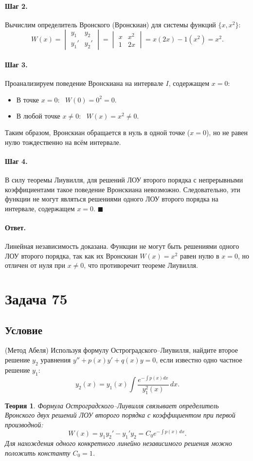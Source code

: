 \documentclass[12pt,a4paper]{article}
\theoremstyle{solution}
\newtheorem*{theory}{Теория}
\newcommand{\task}[1]{\newpage\section*{Задача #1}}
\newcommand{\answer}{\paragraph{Ответ.}}
\newcommand{\step}[1]{\paragraph{Шаг #1.}}
\begin{document}
\step{2} Вычислим определитель Вронского (Вронскиан) для системы функций $\{x, x^2\}$:
\[
W(x) = \begin{vmatrix} y_1 & y_2 \\ y_1' & y_2' \end{vmatrix} = \begin{vmatrix} x & x^2 \\ 1 & 2x \end{vmatrix} = x(2x) - 1(x^2) = x^2.
\]

\step{3} Проанализируем поведение Вронскиана на интервале $I$, содержащем $x = 0$:
\begin{itemize}
    \item В точке $x = 0$: \ $W(0) = 0^2 = 0$.
    \item В любой точке $x \neq 0$: \ $W(x) = x^2 \neq 0$.
\end{itemize}
Таким образом, Вронскиан обращается в нуль в одной точке ($x=0$), но не равен нулю тождественно на всём интервале.

\step{4} В силу теоремы Лиувилля, для решений ЛОУ второго порядка с непрерывными коэффициентами такое поведение Вронскиана невозможно. Следовательно, эти функции не могут являться решениями одного ЛОУ второго порядка на интервале, содержащем $x = 0$. \quad$\blacksquare$

\answer
Линейная независимость доказана. Функции не могут быть решениями одного ЛОУ второго порядка, так как их Вронскиан $W(x) = x^2$ равен нулю в $x=0$, но отличен от нуля при $x \neq 0$, что противоречит теореме Лиувилля.

\task{75}
\subsection*{Условие}
(Метод Абеля) Используя формулу Остроградского–Лиувилля, найдите второе решение $y_2$ уравнения $y'' + p(x)y' + q(x)y = 0$, если известно одно частное решение $y_1$:
\[
y_2(x) = y_1(x) \int \frac{e^{-\int p(x)dx}}{y_1^2(x)}\,dx.
\]

\begin{theory}
Формула Остроградского–Лиувилля связывает определитель Вронского двух решений ЛОУ второго порядка с коэффициентом при первой производной:
\[
W(x) = y_1 y_2' - y_1' y_2 = C_0 e^{-\int p(x)\,dx}.
\]
Для нахождения одного конкретного линейно независимого решения можно положить константу $C_0 = 1$.
\end{theory}
\end{document}
